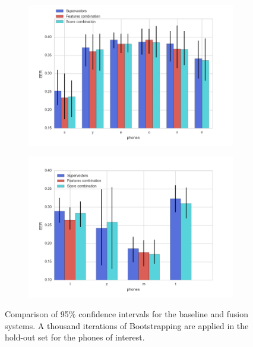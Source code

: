 \begin{figure}[H]
  \centering
  \begin{subfigure}{.47\textwidth}
    \centering
    \captionsetup{width=.95\linewidth}
    \includegraphics[width=.95\linewidth]{files/figures/results/bootstrapping/bootstrapping_heldout_2}
    \caption{}
    \label{fig:bootstrappingHoldOutA}
  \end{subfigure}
  \begin{subfigure}{.47\textwidth}
    \centering
    \captionsetup{width=.95\linewidth}
    \includegraphics[width=.95\linewidth]{files/figures/results/bootstrapping/bootstrapping_heldout_1}
    \caption{}
    \label{fig:bootstrappingHoldOutB}
  \end{subfigure}
  \caption{Comparison of 95\% confidence intervals for the baseline and fusion systems.
  A thousand iterations of Bootstrapping are applied
  in the hold-out set for the phones of interest.}
  \label{fig:bootstrappingHoldOut}
\end{figure}




